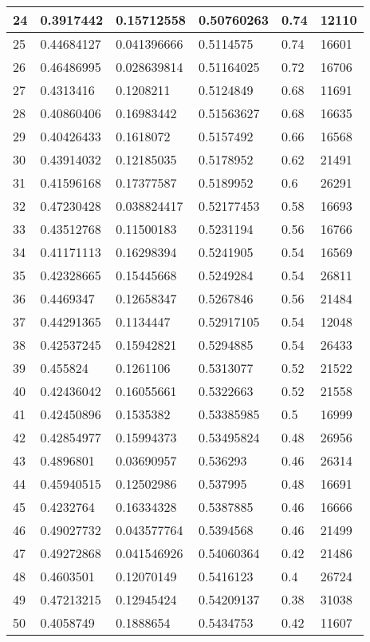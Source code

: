 \begin{longtable}{|l|l|l|l|l|l|}
24 & 0.3917442 & 0.15712558 & 0.50760263 & 0.74 & 12110 \\ \hline 
25 & 0.44684127 & 0.041396666 & 0.5114575 & 0.74 & 16601 \\ \hline 
26 & 0.46486995 & 0.028639814 & 0.51164025 & 0.72 & 16706 \\ \hline 
27 & 0.4313416 & 0.1208211 & 0.5124849 & 0.68 & 11691 \\ \hline 
28 & 0.40860406 & 0.16983442 & 0.51563627 & 0.68 & 16635 \\ \hline 
29 & 0.40426433 & 0.1618072 & 0.5157492 & 0.66 & 16568 \\ \hline 
30 & 0.43914032 & 0.12185035 & 0.5178952 & 0.62 & 21491 \\ \hline 
31 & 0.41596168 & 0.17377587 & 0.5189952 & 0.6 & 26291 \\ \hline 
32 & 0.47230428 & 0.038824417 & 0.52177453 & 0.58 & 16693 \\ \hline 
33 & 0.43512768 & 0.11500183 & 0.5231194 & 0.56 & 16766 \\ \hline 
34 & 0.41171113 & 0.16298394 & 0.5241905 & 0.54 & 16569 \\ \hline 
35 & 0.42328665 & 0.15445668 & 0.5249284 & 0.54 & 26811 \\ \hline 
36 & 0.4469347 & 0.12658347 & 0.5267846 & 0.56 & 21484 \\ \hline 
37 & 0.44291365 & 0.1134447 & 0.52917105 & 0.54 & 12048 \\ \hline 
38 & 0.42537245 & 0.15942821 & 0.5294885 & 0.54 & 26433 \\ \hline 
39 & 0.455824 & 0.1261106 & 0.5313077 & 0.52 & 21522 \\ \hline 
40 & 0.42436042 & 0.16055661 & 0.5322663 & 0.52 & 21558 \\ \hline 
41 & 0.42450896 & 0.1535382 & 0.53385985 & 0.5 & 16999 \\ \hline 
42 & 0.42854977 & 0.15994373 & 0.53495824 & 0.48 & 26956 \\ \hline 
43 & 0.4896801 & 0.03690957 & 0.536293 & 0.46 & 26314 \\ \hline 
44 & 0.45940515 & 0.12502986 & 0.537995 & 0.48 & 16691 \\ \hline 
45 & 0.4232764 & 0.16334328 & 0.5387885 & 0.46 & 16666 \\ \hline 
46 & 0.49027732 & 0.043577764 & 0.5394568 & 0.46 & 21499 \\ \hline 
47 & 0.49272868 & 0.041546926 & 0.54060364 & 0.42 & 21486 \\ \hline 
48 & 0.4603501 & 0.12070149 & 0.5416123 & 0.4 & 26724 \\ \hline 
49 & 0.47213215 & 0.12945424 & 0.54209137 & 0.38 & 31038 \\ \hline 
50 & 0.4058749 & 0.1888654 & 0.5434753 & 0.42 & 11607 \\ \hline 
\end{longtable}
